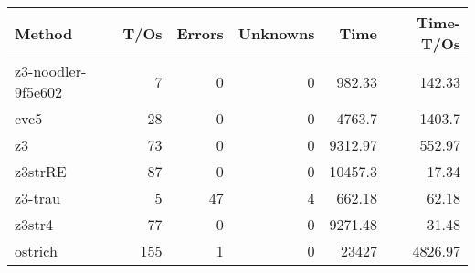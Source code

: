 \begin{tabular}{lrrrrr}
\hline
 Method             &   T/Os &   Errors &   Unknowns &     Time &   Time-T/Os \\
\hline
 z3-noodler-9f5e602 &      7 &        0 &          0 &   982.33 &      142.33 \\
 cvc5               &     28 &        0 &          0 &  4763.7  &     1403.7  \\
 z3                 &     73 &        0 &          0 &  9312.97 &      552.97 \\
 z3strRE            &     87 &        0 &          0 & 10457.3  &       17.34 \\
 z3-trau            &      5 &       47 &          4 &   662.18 &       62.18 \\
 z3str4             &     77 &        0 &          0 &  9271.48 &       31.48 \\
 ostrich            &    155 &        1 &          0 & 23427    &     4826.97 \\
\hline
\end{tabular}
